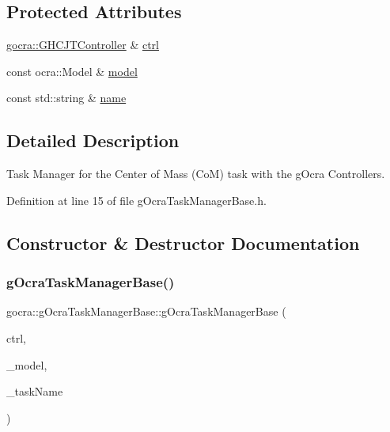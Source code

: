 \subsection*{Protected Attributes}
\begin{DoxyCompactItemize}
\item 
\hyperlink{classgocra_1_1GHCJTController}{gocra\+::\+G\+H\+C\+J\+T\+Controller} \& \hyperlink{classgocra_1_1gOcraTaskManagerBase_a52d76d9b54d92f3d31faeaafda99e4c7}{ctrl}
\item 
const ocra\+::\+Model \& \hyperlink{classgocra_1_1gOcraTaskManagerBase_adc439e7170f7120611fc6d009d06404e}{model}
\item 
const std\+::string \& \hyperlink{classgocra_1_1gOcraTaskManagerBase_adfda0d31ecfa9afea1380f076a472f37}{name}
\end{DoxyCompactItemize}


\subsection{Detailed Description}
Task Manager for the Center of Mass (CoM) task with the g\+Ocra Controllers. 



Definition at line 15 of file g\+Ocra\+Task\+Manager\+Base.\+h.



\subsection{Constructor \& Destructor Documentation}
\hypertarget{classgocra_1_1gOcraTaskManagerBase_aeb3bde0cba73fbf7cf261f5293133f54}{}\label{classgocra_1_1gOcraTaskManagerBase_aeb3bde0cba73fbf7cf261f5293133f54} 
\subsubsection{\texorpdfstring{g\+Ocra\+Task\+Manager\+Base()}{gOcraTaskManagerBase()}}
{\footnotesize\ttfamily gocra\+::g\+Ocra\+Task\+Manager\+Base\+::g\+Ocra\+Task\+Manager\+Base (\begin{DoxyParamCaption}\item[{\hyperlink{classgocra_1_1GHCJTController}{gocra\+::\+G\+H\+C\+J\+T\+Controller} \&}]{ctrl,  }\item[{const ocra\+::\+Model \&}]{\+\_\+model,  }\item[{const std\+::string \&}]{\+\_\+task\+Name }\end{DoxyParamCaption})}

